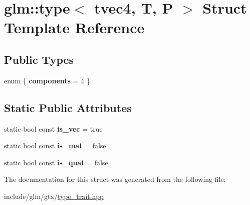 \hypertarget{structglm_1_1type_3_01tvec4_00_01T_00_01P_01_4}{}\section{glm\+:\+:type$<$ tvec4, T, P $>$ Struct Template Reference}
\label{structglm_1_1type_3_01tvec4_00_01T_00_01P_01_4}
\subsection*{Public Types}
\begin{DoxyCompactItemize}
\item 
\mbox{\label{structglm_1_1type_3_01tvec4_00_01T_00_01P_01_4_ab8f45c3e09b6f99ee5b9c4eff9629d77}} 
enum \{ {\bfseries components} = 4
 \}
\end{DoxyCompactItemize}
\subsection*{Static Public Attributes}
\begin{DoxyCompactItemize}
\item 
\mbox{\label{structglm_1_1type_3_01tvec4_00_01T_00_01P_01_4_a7eadb533939a5fc3bc00f4fa4682e578}} 
static bool const {\bfseries is\+\_\+vec} = true
\item 
\mbox{\label{structglm_1_1type_3_01tvec4_00_01T_00_01P_01_4_a1dbc37d661357604961a167bedc7e69e}} 
static bool const {\bfseries is\+\_\+mat} = false
\item 
\mbox{\label{structglm_1_1type_3_01tvec4_00_01T_00_01P_01_4_aa3a4a4b0e7b22e095974264f9e1e1e40}} 
static bool const {\bfseries is\+\_\+quat} = false
\end{DoxyCompactItemize}


The documentation for this struct was generated from the following file\+:\begin{DoxyCompactItemize}
\item 
include/glm/gtx/\hyperlink{type__trait_8hpp}{type\+\_\+trait.\+hpp}\end{DoxyCompactItemize}
